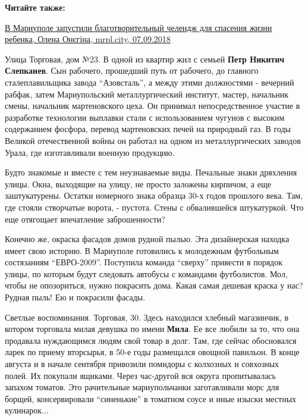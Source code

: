 \textbf{Читайте также:} 

\href{https://mrpl.city/news/view/v-mariupole-zapustili-blagotvoritelnyj-chelendzh-dlya-spaseniya-zhizni-rebenka}{%
В Мариуполе запустили благотворительный челендж для спасения жизни ребенка, Олена Онєгіна, mrpl.city, 07.09.2018}

Улица Торговая, дом №23. В одной из квартир жил с семьей \textbf{Петр Никитич
Слепканев}. Сын рабочего, прошедший путь от рабочего, до главного
сталеплавильщика завода \enquote{Азовсталь}, а между этими должностями - вечерний
рабфак, затем Мариупольский металлургический институт, мастер, начальник смены,
начальник мартеновского цеха. Он принимал непосредственное участие в разработке
технологии выплавки стали с использованием чугунов с высоким содержанием
фосфора, перевод мартеновских печей на природный газ. В годы Великой
отечественной войны он работал на одном из металлургических заводов Урала, где
изготавливали военную продукцию.


Будто знакомые и вместе с тем неузнаваемые виды. Печальные знаки дряхления
улицы. Окна, выходящие на улицу, не просто заложены кирпичом, а еще
заштукатурены. Остатки номерного знака образца 30-х годов прошлого века. Там,
где стояли створчатые ворота, - пустота. Стены с обвалившейся штукатуркой. Что
еще отягощает впечатление заброшенности?

Конечно же, окраска фасадов домов рудной пылью. Эта дизайнерская находка имеет
свою историю. В Мариуполе готовились к молодежным футбольным состязаниям
\enquote{ЕВРО-2009}. Поступила команда \enquote{сверху} привести в порядок улицы, по которым
будут следовать автобусы с командами футболистов. Мол, чтобы не опозориться,
нужно покрасить дома. Какая самая дешевая краска у нас? Рудная пыль! Ею и
покрасили фасады.


Светлые воспоминания. Торговая, 30. Здесь находился хлебный магазинчик, в
котором торговала милая девушка по имени \textbf{Мила}. Ее все любили за то, что она
продавала нуждающимся людям свой товар в долг. Там, где сейчас обосновался
ларек по приему вторсырья, в 50-е годы размещался овощной павильон. В конце
августа и в начале сентября привозили помидоры с колхозных и совхозных полей.
Их покупали ящиками. Через час-другой вся округа пропитывалась запахом томатов.
Это рачительные мариупольчанки заготавливали морс для борщей, консервировали
\enquote{синенькие} в томатном соусе и иные изыски местных кулинарок...

